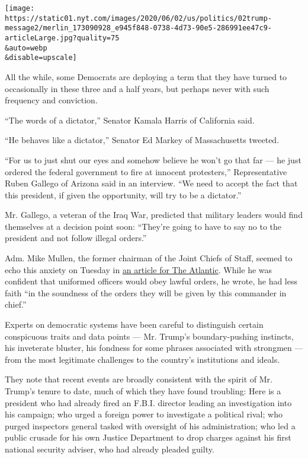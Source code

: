 \texttt{[image: https://static01.nyt.com/images/2020/06/02/us/politics/02trump-message2/merlin\_173090928\_e945f848-0738-4d73-90e5-286991ee47c9-articleLarge.jpg?quality=75\\\&auto=webp\\\&disable=upscale]}

All the while, some Democrats are deploying a term that they have turned
to occasionally in these three and a half years, but perhaps never with
such frequency and conviction.

``The words of a dictator,'' Senator Kamala Harris of California said.

``He behaves like a dictator,'' Senator Ed Markey of Massachusetts
tweeted.

``For us to just shut our eyes and somehow believe he won't go that far
--- he just ordered the federal government to fire at innocent
protesters,'' Representative Ruben Gallego of Arizona said in an
interview. ``We need to accept the fact that this president, if given
the opportunity, will try to be a dictator.''

Mr. Gallego, a veteran of the Iraq War, predicted that military leaders
would find themselves at a decision point soon: ``They're going to have
to say no to the president and not follow illegal orders.''

Adm. Mike Mullen, the former chairman of the Joint Chiefs of Staff,
seemed to echo this anxiety on Tuesday in
\href{https://www.theatlantic.com/ideas/archive/2020/06/american-cities-are-not-battlespaces/612553/}{an
article for The Atlantic}. While he was confident that uniformed
officers would obey lawful orders, he wrote, he had less faith ``in the
soundness of the orders they will be given by this commander in chief.''

Experts on democratic systems have been careful to distinguish certain
conspicuous traits and data points --- Mr. Trump's boundary-pushing
instincts, his inveterate bluster, his fondness for some phrases
associated with strongmen --- from the most legitimate challenges to the
country's institutions and ideals.

They note that recent events are broadly consistent with the spirit of
Mr. Trump's tenure to date, much of which they have found troubling:
Here is a president who had already fired an F.B.I. director leading an
investigation into his campaign; who urged a foreign power to
investigate a political rival; who purged inspectors general tasked with
oversight of his administration; who led a public crusade for his own
Justice Department to drop charges against his first national security
adviser, who had already pleaded guilty.


